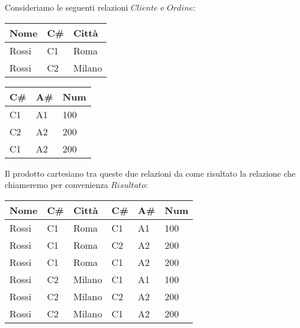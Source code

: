 \begin{exmp}
 Consideriamo le seguenti relazioni $Cliente$ e $Ordine$:
 \begin{center}
 \begin{multicols}{2}

 \begin{tabular}{l | l | l}
  Nome & C\# & Città\\
  \hline
  Rossi & C1 & Roma\\
  Rossi & C2 & Milano\\
 \end{tabular}
 
 \begin{tabular}{l | l | l}
  C\# & A\# & Num \\
  \hline
  C1 & A1 & 100\\
  C2 & A2 & 200\\
  C1 & A2 & 200\\
 \end{tabular}

\end{multicols}
\end{center}

Il prodotto cartesiano tra queste due relazioni da come risultato la relazione
che chiameremo per convenienza $Risultato$:

\begin{center}
 \begin{tabular}{l|l|l|l|l|l}
  Nome & C\# & Città & C\# & A\# & Num\\
  \hline
  Rossi & C1 & Roma & C1 & A1 & 100\\
  Rossi & C1 & Roma & C2 & A2 & 200\\
  Rossi & C1 & Roma & C1 & A2 & 200\\
  Rossi & C2 & Milano & C1 & A1 & 100\\
  Rossi & C2 & Milano & C2 & A2 & 200\\
  Rossi & C2 & Milano & C1 & A2 & 200\\
 \end{tabular}

\end{center}

\end{exmp}

